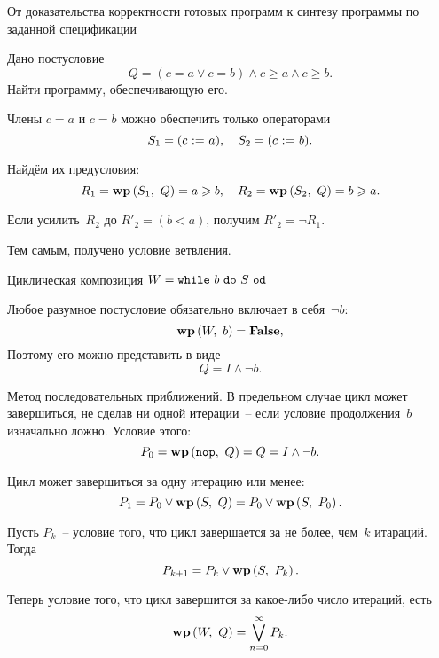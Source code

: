 \documentclass[landscape]{slides}
\begin{document}
\begin{slide}
От доказательства корректности готовых программ к синтезу программы по заданной спецификации

Дано постусловие
\[
    Q = (c=a\lor c=b)\land c\geqslant a \land c\geqslant b.
\]
Найти программу, обеспечивающую его.

Члены $c=a$ и $c=b$ можно обеспечить только операторами
\[
    S_1 = (c\ \mathtt{:=}\  a),\quad S_2 = (c\ \mathtt{:=}\  b) .
\]

Найдём их предусловия:
\[
R_1 = \mathbf{wp}\left({S_1},\ {Q}\right) = a\geqslant b,
\quad
R_2 = \mathbf{wp}\left({S_2},\ {Q}\right) = b\geqslant a.
\]

Если усилить~$R_2$ до $R'_2 = (b<a)$, получим $R'_2 = \neg R_1$.

Тем самым, получено условие ветвления.
\end{slide}

\begin{slide}
        Циклическая композиция $W = \mathtt{while}\ {b}\ \mathtt{do}\ {S}\ \mathtt{od}$

        Любое разумное постусловие обязательно включает в себя~$\neg b$:
        \[
                \mathbf{wp}\left({W},\ {b}\right) = \mathbf{False} ,
        \]
        Поэтому его можно представить в виде
        \[
                Q = I\land \neg b .
        \]

        Метод последовательных приближений. В предельном случае
        цикл может завершиться, не сделав ни одной итерации~--
        если условие продолжения~$b$ изначально ложно. Условие этого:
        \[
                P_0 = \mathbf{wp}\left({\mathtt{nop}},\ {Q}\right) = Q = I\land \neg b .
        \]
\end{slide}

\begin{slide}
        Цикл может завершиться за одну итерацию или менее:
        \[
                P_1 = P_0 \lor \mathbf{wp}\left({S},\ {Q}\right) = P_0 \lor \mathbf{wp}\left({S},\ {P_0}\right) .
        \]

        Пусть $P_k$~-- условие того, что цикл завершается за не более, чем~$k$ итараций.
        Тогда
        \[
                P_{k+1} = P_k \lor \mathbf{wp}\left({S},\ {P_k}\right) .
        \]

        Теперь условие того, что цикл завершится за какое-либо число итераций, есть
        \[
                \mathbf{wp}\left({W},\ {Q}\right) = \bigvee_{n=0}^{\infty} P_k .
        \]
\end{slide}
\end{document}
